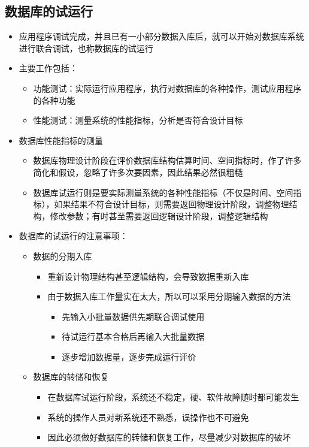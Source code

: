 \subsection{数据库的试运行}
\begin{itemize}
    \item 应用程序调试完成，并且已有一小部分数据入库后，就可以开始对数据库系统进行联合调试，也称数据库的试运行
    \item 主要工作包括：
    \begin{itemize}
        \item 功能测试：实际运行应用程序，执行对数据库的各种操作，测试应用程序的各种功能
        \item 性能测试：测量系统的性能指标，分析是否符合设计目标
    \end{itemize}
    \item 数据库性能指标的测量
    \begin{itemize}
        \item 数据库物理设计阶段在评价数据库结构估算时间、空间指标时，作了许多简化和假设，忽略了许多次要因素，因此结果必然很粗糙
        \item 数据库试运行则是要实际测量系统的各种性能指标（不仅是时间、空间指标），如果结果不符合设计目标，则需要返回物理设计阶段，调整物理结构，修改参数；有时甚至需要返回逻辑设计阶段，调整逻辑结构
    \end{itemize}
    \item 数据库的试运行的注意事项：
    \begin{itemize}
        \item 数据的分期入库
        \begin{itemize}
            \item 重新设计物理结构甚至逻辑结构，会导致数据重新入库
            \item 由于数据入库工作量实在太大，所以可以采用分期输入数据的方法
            \begin{itemize}
                \item 先输入小批量数据供先期联合调试使用
                \item 待试运行基本合格后再输入大批量数据
                \item 逐步增加数据量，逐步完成运行评价
            \end{itemize}
        \end{itemize}
        \item 数据库的转储和恢复
        \begin{itemize}
            \item 在数据库试运行阶段，系统还不稳定，硬、软件故障随时都可能发生
            \item 系统的操作人员对新系统还不熟悉，误操作也不可避免
            \item 因此必须做好数据库的转储和恢复工作，尽量减少对数据库的破坏
        \end{itemize}
    \end{itemize}
\end{itemize}

